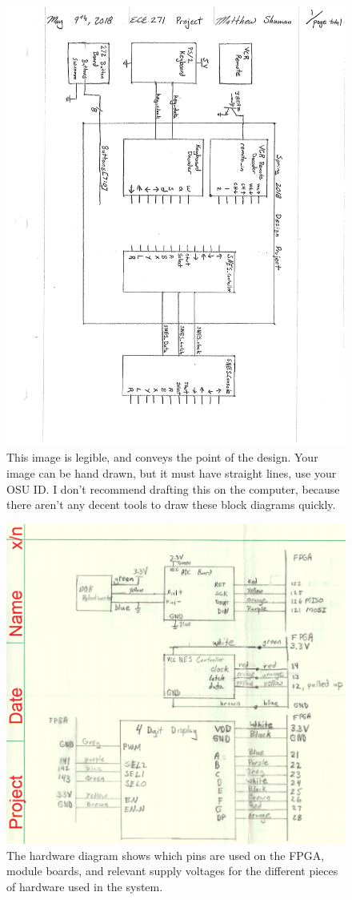 \documentclass[a4paper]{article}
\begin{document}
\begin{figure}[h]
  \centering
    \includegraphics[width=.8\textwidth]{images/description.png}
	\caption{This image is legible, and conveys the point of the design.  Your image can be hand drawn, but it must have straight lines, use your OSU ID.  I don't recommend drafting this on the computer, because there aren't any decent tools to draw these block diagrams quickly.}
    \label{fig:description}
\end{figure}

\begin{figure}[h]
  \centering
    \includegraphics[width=.8\textwidth]{images/hardware.png}
	\caption{The hardware diagram shows which pins are used on the FPGA, module boards, and relevant supply voltages for the different pieces of hardware used in the system.}
    \label{fig:hardware}
\end{figure}
\end{document}
